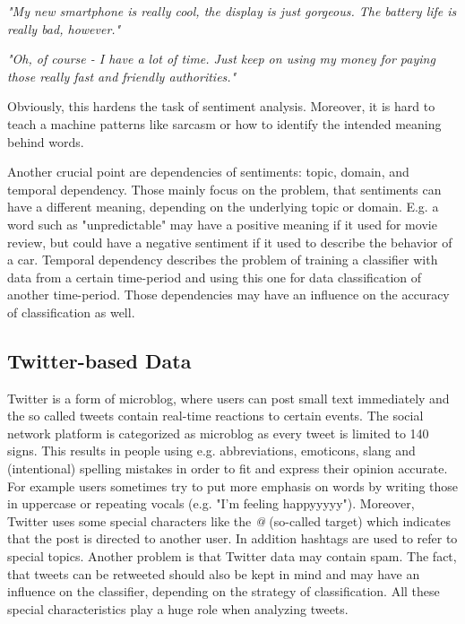 \documentclass{acm_proc_article-sp}
\begin{document}
\textit{"My new smartphone is really cool, the display is just gorgeous. The
battery life is really bad, however."}

\textsl{"Oh, of course - I have a lot of time. Just keep on using my money for
paying those really fast and friendly authorities."}

Obviously, this hardens the task of sentiment analysis. Moreover, it is hard to
teach a machine patterns like sarcasm or how to identify the intended meaning
behind words.  \cite{liu2010sentimentanalysis,pang2008opinion}


Another crucial point are dependencies of sentiments: topic, domain, and
temporal dependency. Those mainly focus on the problem, that sentiments can
have a different meaning, depending on the underlying topic or domain. E.g. a
word such as "unpredictable" may have a positive meaning if it used for movie
review, but could have a negative sentiment if it used to describe the behavior
of a car. Temporal dependency describes the problem of training a classifier
with data from a certain time-period and using this one for data classification
of another time-period.  Those dependencies may have an influence on the
accuracy of classification as well.  \cite{read2005using,pang2008opinion}

\subsection{Twitter-based Data} \label{twitter-based} Twitter is a form of
microblog, where users can post small text immediately and the so called tweets
contain real-time reactions to certain events. The social network platform is
categorized as microblog as every tweet is limited to 140 signs. This results
in people using e.g. abbreviations, emoticons, slang and (intentional) spelling
mistakes in order to fit and express their opinion accurate. For example users
sometimes try to put more emphasis on words by writing those in uppercase or
repeating vocals (e.g. "I'm feeling happyyyyy"). Moreover, Twitter uses some
special characters like the \emph{@} (so-called target) which indicates that
the post is directed to another user. In addition hashtags are used to refer to
special topics.  Another problem is that Twitter data may contain spam. The
fact, that tweets can be retweeted should also be kept in mind and may have an
influence on the classifier, depending on the strategy of classification.  All
these special characteristics play a huge role when analyzing tweets.
\cite{agarwal2011sentiment, read2005using}
\end{document}
